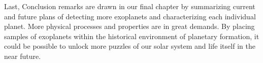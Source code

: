 \begin{englishabstract}
Last, Conclusion remarks are drawn in our final chapter by summarizing current and future plans of detecting 
more exoplanets and characterizing each individual planet. More physical processes and properties are in great 
demands. By placing samples of exoplanets within the historical environment of planetary formation, it could be 
possible to unlock more puzzles of our solar system and life itself in the near future.
 

\end{englishabstract}


